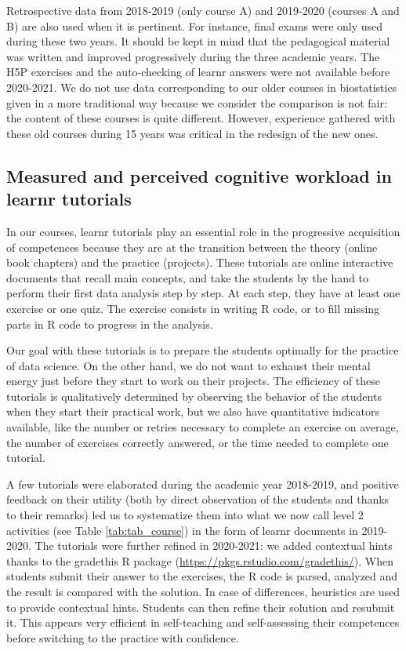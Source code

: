 \documentclass{aims}
\theoremstyle{definition}
\begin{document}
Retrospective data from 2018-2019 (only course A) and 2019-2020 (courses
A and B) are also used when it is pertinent. For instance, final exams
were only used during these two years. It should be kept in mind that
the pedagogical material was written and improved progressively during
the three academic years. The H5P exercises and the auto-checking of
learnr answers were not available before 2020-2021. We do not use data
corresponding to our older courses in biostatistics given in a more
traditional way because we consider the comparison is not fair: the
content of these courses is quite different. However, experience
gathered with these old courses during 15 years was critical in the
redesign of the new ones.

\hypertarget{measured-and-perceived-cognitive-workload-in-learnr-tutorials}{%
\subsection{Measured and perceived cognitive workload in learnr
tutorials}\label{measured-and-perceived-cognitive-workload-in-learnr-tutorials}}

In our courses, learnr tutorials play an essential role in the
progressive acquisition of competences because they are at the
transition between the theory (online book chapters) and the practice
(projects). These tutorials are online interactive documents that recall
main concepts, and take the students by the hand to perform their first
data analysis step by step. At each step, they have at least one
exercise or one quiz. The exercise consists in writing R code, or to
fill missing parts in R code to progress in the analysis.

Our goal with these tutorials is to prepare the students optimally for
the practice of data science. On the other hand, we do not want to
exhaust their mental energy just before they start to work on their
projects. The efficiency of these tutorials is qualitatively determined
by observing the behavior of the students when they start their
practical work, but we also have quantitative indicators available, like
the number or retries necessary to complete an exercise on average, the
number of exercises correctly answered, or the time needed to complete
one tutorial.

A few tutorials were elaborated during the academic year 2018-2019, and
positive feedback on their utility (both by direct observation of the
students and thanks to their remarks) led us to systematize them into
what we now call level 2 activities (see Table \ref {tab:tab_course}) in
the form of learnr documents in 2019-2020. The tutorials were further
refined in 2020-2021: we added contextual hints thanks to the gradethis
R package (\url{https://pkgs.rstudio.com/gradethis/}). When students
submit their answer to the exercises, the R code is parsed, analyzed and
the result is compared with the solution. In case of differences,
heuristics are used to provide contextual hints. Students can then
refine their solution and resubmit it. This appears very efficient in
self-teaching and self-assessing their competences before switching to
the practice with confidence.
\end{document}
